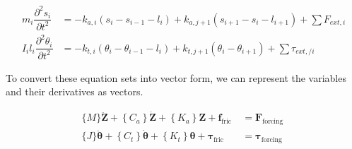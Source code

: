 \begin{align}\label{Governing equations}
     m_{i}\dfrac{\partial^{2}s_{i}}{\partial t^{2}} & = -k_{a,i}(s_{i}-s_{i-1}-l_{i}) + k_{a,j+1}(s_{i+1}-s_{i}-l_{i+1}) + \sum{F_{ext, i}} \\
     I_{i}l_{i}\dfrac{\partial^{2}\theta_{i}}{\partial t^{2}} & = -k_{t,i}(\theta_{i}-\theta_{i-1}-l_{i}) + k_{t,j+1}(\theta_{i}-\theta_{i+1}) + \sum{\tau_{ext,/ i}}
\end{align}

To convert these equation sets into vector form, we can represent the variables and their derivatives as vectors.

\begin{align}
  \{M\} \ddot{\boldsymbol{Z}}+\left\{C_a\right\} \dot{\boldsymbol{Z}}+\left\{K_a\right\} \boldsymbol{Z}+\boldsymbol{f}_{\text {fric }} &= \boldsymbol{F}_{\text {forcing }} \label{eq:em_axial_vector_form}\\
  \{J\} \ddot{\boldsymbol{\theta}}+\left\{C_t\right\} \dot{\boldsymbol{\theta}}+\left\{K_t\right\} \boldsymbol{\theta}+\boldsymbol{\tau}_{\text {fric }} &= \boldsymbol{\tau}_{\text {forcing }} \label{eq:em_torsional_vector_form}
\end{align}


